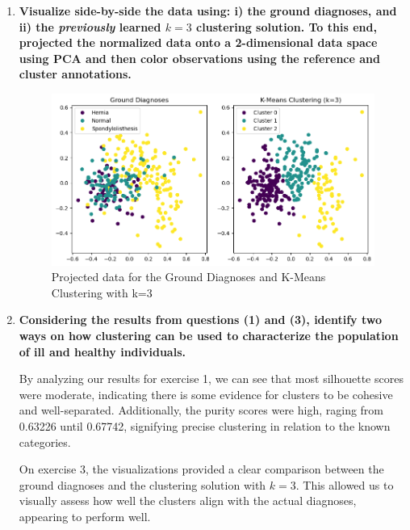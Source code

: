 \documentclass[12pt]{article}
\begin{document}
\begin{enumerate}[leftmargin=\labelsep]
\begin{enumerate}
        \end{enumerate}

  \item \textbf{Visualize side-by-side the data using: i) the ground diagnoses, and ii) the \textit{previously} learned
          $k = 3$ clustering solution. To this end, projected the normalized data onto a 2-dimensional data
          space using PCA and then color observations using the reference and cluster annotations.}

        \vskip 0.3cm
        

        \begin{figure}[H]
          \centering
          \includegraphics[width=18cm]{./assets/exII3-plot.png}
          \caption{Projected data for the Ground Diagnoses and K-Means Clustering with k=3}
          \label{fig:PartII-ex3}
        \end{figure}

  \item \textbf{Considering the results from questions (1) and (3), identify two ways on how clustering can
          be used to characterize the population of ill and healthy individuals.}

        \vskip 0.3cm
        
        By analyzing our results for exercise 1, we can see that most silhouette scores were moderate,  indicating there is some evidence for clusters to be
         cohesive and well-separated. Additionally, the purity scores were high, raging from 0.63226 until 0.67742, signifying precise clustering in relation to the known categories.
        
        On exercise 3, the visualizations provided a clear comparison between the ground diagnoses and the clustering solution with \(k=3\). This allowed us to visually assess how well
         the clusters align with the actual diagnoses, appearing to perform well.
        

\end{enumerate}
\end{document}
